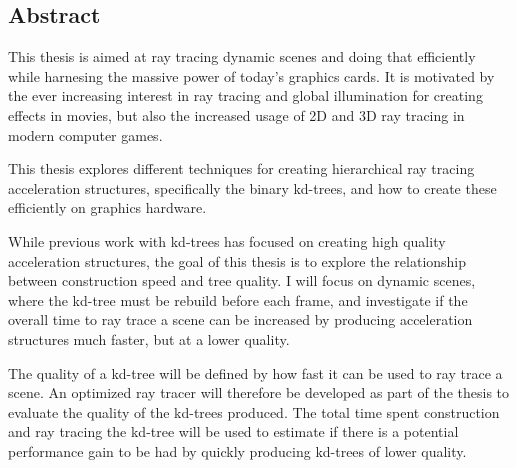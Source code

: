 

\begin{center}
\begin{minipage}{0.7\textwidth}
\section*{Abstract}

This thesis is aimed at ray tracing dynamic scenes and doing that efficiently
while harnesing the massive power of today's graphics cards. It is motivated by
the ever increasing interest in ray tracing and global illumination for creating
effects in movies, but also the increased usage of 2D and 3D ray tracing in
modern computer games.

This thesis explores different techniques for creating hierarchical ray tracing
acceleration structures, specifically the binary kd-trees, and how to create
these efficiently on graphics hardware.

While previous work with kd-trees has focused on creating high quality
acceleration structures, the goal of this thesis is to explore the relationship
between construction speed and tree quality. I will focus on dynamic scenes,
where the kd-tree must be rebuild before each frame, and investigate if the
overall time to ray trace a scene can be increased by producing acceleration
structures much faster, but at a lower quality.

The quality of a kd-tree will be defined by how fast it can be used to ray trace
a scene. An optimized ray tracer will therefore be developed as part of the
thesis to evaluate the quality of the kd-trees produced. The total time spent
construction and ray tracing the kd-tree will be used to estimate if there is a
potential performance gain to be had by quickly producing kd-trees of lower
quality.

\end{minipage}
\end{center}


